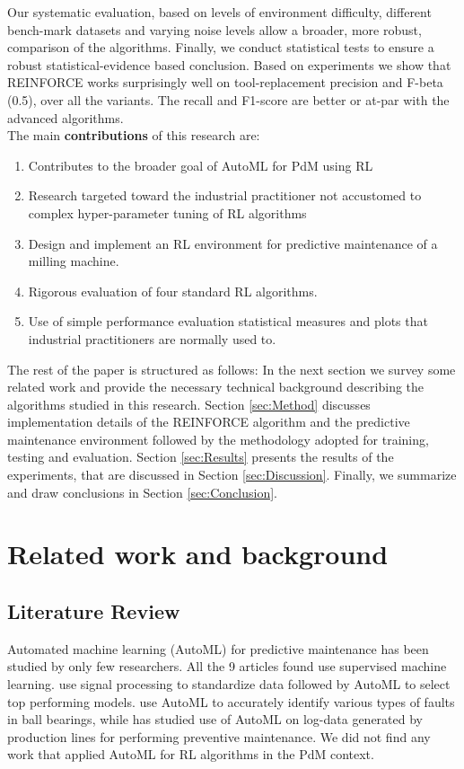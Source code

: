 \documentclass[a4paper, 12pt]{article}
\begin{document}
Our systematic evaluation, based on levels of environment difficulty, different bench-mark datasets and varying noise levels allow a broader, more robust, comparison of the algorithms. Finally, we conduct statistical tests to ensure a robust statistical-evidence based conclusion. Based on experiments we show that REINFORCE works surprisingly well on tool-replacement precision and F-beta (0.5), over all the variants. The recall and F1-score are better or at-par with the advanced algorithms.\\

The main \textbf{contributions} of this research are:
\begin{enumerate}
	\item Contributes to the broader goal of AutoML for PdM using RL
	\item Research targeted toward the industrial practitioner not accustomed to complex hyper-parameter tuning of RL algorithms
	\item Design and implement an RL environment for predictive maintenance of a milling machine.
	\item Rigorous evaluation of four standard RL algorithms.
	\item Use of simple performance evaluation statistical measures and plots that industrial practitioners are normally used to.
\end{enumerate} 

The rest of the paper is structured as follows: In the next section we survey some related work and provide the necessary technical background describing the algorithms studied in this research. Section \ref{sec:Method} discusses implementation details of the REINFORCE algorithm and the predictive maintenance environment followed by the methodology adopted for training, testing and evaluation. Section \ref{sec:Results} presents the results of the experiments, that are discussed in Section \ref{sec:Discussion}. Finally, we summarize and draw conclusions in Section \ref{sec:Conclusion}.

\section{Related work and background}\label{sec:SLR}
\subsection{Literature Review}
Automated machine learning (AutoML) for predictive maintenance has been studied by only few researchers. All the 9 articles found use supervised machine learning. \cite{AutoML-Larocque} use signal processing to standardize data followed by AutoML to select top performing models. \cite{AutoML-Hadi} use AutoML to accurately identify various types of faults in ball bearings, while \cite{AutoML-Maurer} has studied use of AutoML on log-data generated by production lines for performing preventive maintenance. We did not find any work that applied AutoML for RL algorithms in the PdM context. 
\end{document}
